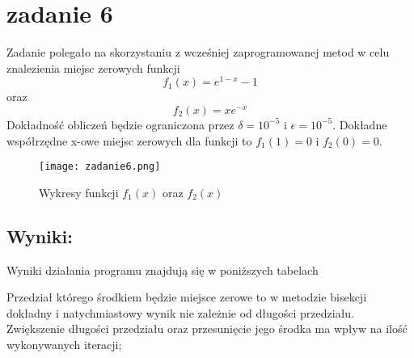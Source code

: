 \section{zadanie 6}
Zadanie polegało na skorzystaniu z wcześniej zaprogramowanej metod w celu znalezienia miejsc zerowych funkcji \[f_1(x) = e^{1-x} - 1\] oraz \[f_2(x) = x e^{-x}\]
Dokładność obliczeń będzie ograniczona przez \(\delta = 10^{-5}\) i \(\epsilon = 10^{-5}\).
Dokładne współrzędne x-owe miejsc zerowych dla funkcji to \(f_1(1) = 0\) i \(f_2(0) = 0\).
\begin{figure}[ht]
  \centering
  \texttt{[image: zadanie6.png]}
  \caption{Wykresy funkcji \(f_1(x)\) oraz \(f_2(x)\)}
\end{figure}

\subsection{Wyniki:}
Wyniki działania programu znajdują się w poniższych tabelach
\begin{table}[ht]
    \caption{wartości z wyjścia programu \textbf{zadanie6.jl - metoda bisekcji}}
\end{table}

Przedział którego środkiem będzie miejsce zerowe to w metodzie bisekcji dokładny i natychmiastowy wynik nie zależnie od długości przedziału. Zwiększenie długości przedziału oraz przesunięcie jego środka ma wpływ na ilość wykonywanych iteracji;

